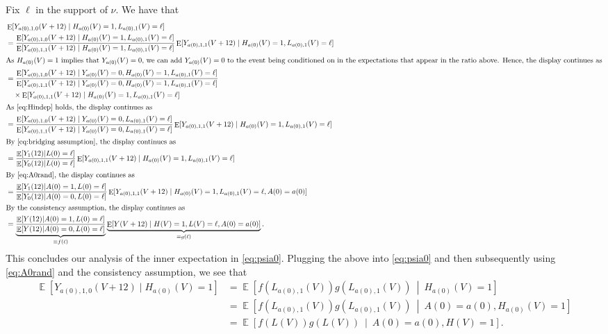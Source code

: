 \documentclass[12pt]{article}
\theoremstyle{definition}
\DeclareMathOperator{\E}{E}
\DeclareMathOperator{\cE}{\mathbb{E}}
\newcommand{\Hopen}{V}
\begin{document}
Fix $\ell$ in the support of $\nu$. We have that
\begin{align}
    &\E[Y_{a(0),1,0}(\Hopen+12) \mid H_{a(0)}(\Hopen)=1, L_{a(0),1}(\Hopen)=\ell] \nonumber \\
    &= \frac{\E[Y_{a(0),1,0}(\Hopen+12) \mid H_{a(0)}(\Hopen)=1,  L_{a(0),1}(\Hopen)=\ell]}{\E[Y_{a(0),1,1}(\Hopen+12) \mid H_{a(0)}(\Hopen)=1,  L_{a(0),1}(\Hopen)=\ell]} \E[Y_{a(0),1,1}(\Hopen+12) \mid H_{a(0)}(\Hopen)=1,  L_{a(0),1}(\Hopen)=\ell] \nonumber \\
    \intertext{As $H_{a(0)}(V)=1$ implies that $Y_{a(0)}(V)=0$, we can add $Y_{a(0)}(V)=0$ to the event being conditioned on in the expectations that appear in the ratio above. Hence, the display continues as}
    &= \frac{\E[Y_{a(0),1,0}(\Hopen+12) \mid Y_{a(0)}(\Hopen)=0, H_{a(0)}(\Hopen)=1,  L_{a(0),1}(\Hopen)=\ell]}{\E[Y_{a(0),1,1}(\Hopen+12) \mid Y_{a(0)}(\Hopen)=0, H_{a(0)}(\Hopen)=1, L_{a(0),1}(\Hopen)=\ell]} \nonumber \\
    &\quad \times \E[Y_{a(0),1,1}(\Hopen+12) \mid H_{a(0)}(\Hopen)=1, L_{a(0),1}(\Hopen)=\ell] \nonumber \\
    \intertext{As \eqref{eq:Hindep} holds, the display continues as}
    &= \frac{\E[Y_{a(0),1,0}(\Hopen+12) \mid Y_{a(0)}(\Hopen)=0, L_{a(0),1}(\Hopen)=\ell]}{\E[Y_{a(0),1,1}(\Hopen+12) \mid Y_{a(0)}(\Hopen)=0, L_{a(0),1}(\Hopen)=\ell]}\E[Y_{a(0),1,1}(\Hopen+12) \mid H_{a(0)}(\Hopen)=1, L_{a(0),1}(\Hopen)=\ell] \nonumber \\
    \intertext{By \eqref{eq:bridging assumption}, the display continues as}
    &= \frac{\cE[Y_{1}(12)|L(0)=\ell]}{\cE[Y_{0}(12)|L(0)=\ell]}  \E[Y_{a(0),1,1}(\Hopen+12) \mid H_{a(0)}(\Hopen)=1, L_{a(0),1}(\Hopen)=\ell] \label{disp:bridge_use} \\
    \intertext{By \eqref{eq:A0rand}, the display continues as}
    &= \frac{\cE[Y_{1}(12)|A(0)=1,L(0)=\ell]}{\cE[Y_{0}(12)|A(0)=0,L(0)=\ell]}  \E[Y_{a(0),1,1}(\Hopen+12) \mid H_{a(0)}(\Hopen)=1, L_{a(0),1}(\Hopen)=\ell,A(0)=a(0)] \nonumber \\
    \intertext{By the consistency assumption, the display continues as}
    &= \underbrace{\frac{\cE[Y(12)|A(0)=1,L(0)=\ell]}{\cE[Y(12)|A(0)=0,L(0)=\ell]}}_{\equiv f(\ell)}  \underbrace{\E[Y(\Hopen+12) \mid H(\Hopen)=1, L(\Hopen)=\ell,A(0)=a(0)]}_{\equiv g(\ell)}. \nonumber
\end{align}
This concludes our analysis of the inner expectation in \eqref{eq:psia0}. Plugging the above into \eqref{eq:psia0} and then subsequently using \eqref{eq:A0rand} and the consistency assumption, we see that
\begin{align*}
    \cE[Y_{a(0),1,0}(\Hopen+12)\mid H_{a(0)}(\Hopen)=1]&= \cE\left[f(L_{a(0),1}(\Hopen)) g(L_{a(0),1}(\Hopen))\ \middle|\  H_{a(0)}(\Hopen)=1\right]\\
    &= \cE\left[f(L_{a(0),1}(\Hopen)) g(L_{a(0),1}(\Hopen))\ \middle|\  A(0)=a(0),H_{a(0)}(\Hopen)=1\right] \\
    &= \cE\left[f(L(\Hopen)) g(L(\Hopen))\ \middle|\  A(0)=a(0),H(\Hopen)=1\right].
\end{align*}
\end{document}
